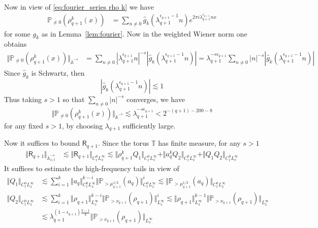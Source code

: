 \documentclass[12pt,reqno,letterpaper]{amsart}
\numberwithin{equation}{section}
\newcommand{\1}{{\bf 1}}
\newcommand{\2}{{\bf 2}}
\newcommand{\A}{\mathbb A}
\newcommand{\T}{\mathbb T}
\renewcommand{\P}{\mathbb{P}}
\newcommand{\norm}[1]{ \Vert #1 \Vert}
\theoremstyle{remark}
\theoremstyle{remark}
\begin{document}
Now in view of
 \eqref{eq:fourier_series rho k} we have
\begin{align*}
    \mathbb{P}_{ \neq 0}( \rho_{q+1}^k(x)) &= \sum_{n \neq 0} \hat{g}_k(\lambda_{q+1}^{\epsilon_{q+1} - 1} n) e^{2\pi i \lambda_{q+1}^{\epsilon_{q+1}} n x}
\end{align*}
for some $g_k$ as in Lemma~\ref{lem:fourier}. Now in the weighted Wiener norm one obtains
\begin{align*}
    \norm{\P_{\neq 0}(\rho_{q+1}^k(x))}_{\dot{\A}^{-s}} &= \sum_{n \neq 0} |\lambda_{q+1}^{\epsilon_{q+1}} n|^{-s} |\hat{g}_k (\lambda_{q+1}^{\epsilon_{q+1} -1} n)| = \lambda_{q+1}^{-s\epsilon_{q+1}} \sum_{n \neq 0} |n|^{-s} |\hat{g}_k (\lambda_{q+1}^{\epsilon_{q+1} -1} n)|
\end{align*}
Since $\hat{g}_k$ is Schwartz, then
\[|\hat{g}_k(\lambda_{q+1}^{\epsilon_{q+1} - 1} n)| \lesssim 1\]
Thus taking $s > 1$ so that $\sum_{n \neq 0} |n|^{-s}$ converges, 
we have
\begin{equation}\label{eq:wiener_est_nonlinearity}
    \norm{\P_{\neq 0}(\rho_{q+1}^k(x))}_{\dot{\A}^{-s}}\lesssim \lambda_{q+1}^{-s\epsilon_{q+1}} < 2^{-(q+1)-200 - 8}
\end{equation}
for any fixed $s > 1$, by choosing $\lambda_{q+1}$ sufficiently large.

Now it suffices to bound $\mathsf{R}_{q+1}$. Since the torus $\T$ has finite measure, for any $s > 1$
\begin{align*}
    \norm{\mathsf{R}_{q+1}}_{\dot{\mathbb{A}}_{x,t}^{-s}} &\lesssim  \norm{\mathsf{R}_{q+1}}_{C_t^0 L_x^\infty} \lesssim \norm{\rho_{q+1}^k Q_1}_{C_t^0 L_x^\infty}  + \norm{a_{q}^k Q_2}_{C_t^0 L_x^\infty} + \norm{Q_1 Q_2}_{C_t^0 L_x^\infty}
\end{align*}
It suffices to estimate the high-frequency tails in view of 
\begin{align*}
    \norm{Q_1}_{C_t^0 L_x^\infty} &\lesssim \sum_{i = 1}^k \norm{a_q}_{C_t^0 L_x^\infty}^{k - i} \norm{\P_{> \mu_{q+1}^{1/2}}(a_q)}_{C_t^0 L_x^\infty}^i \lesssim \norm{\P_{> \mu_{q+1}^{1/2}}(a_q)}_{C_t^0 L_x^\infty}\\
      \norm{Q_2}_{C_t^0 L_x^\infty} &\lesssim  \sum_{i = 1}^k \norm{\rho_{q+1}}_{ L_x^\infty}^{k - i} \norm{\P_{> \nu_{q+1}}(\rho_{q+1})}_{L_x^\infty}^i \lesssim \norm{\rho_{q+1}}_{ L_x^\infty}^{k - 1}\norm{\P_{> \nu_{q+1}}(\rho_{q+1})}_{L_x^\infty}\\
      &\lesssim \lambda_{q+1}^{(1 - \epsilon_{q+1}) \frac{k-1}{k}}\norm{\P_{> \nu_{q+1}}(\rho_{q+1})}_{L_x^\infty}
\end{align*}
\end{document}
